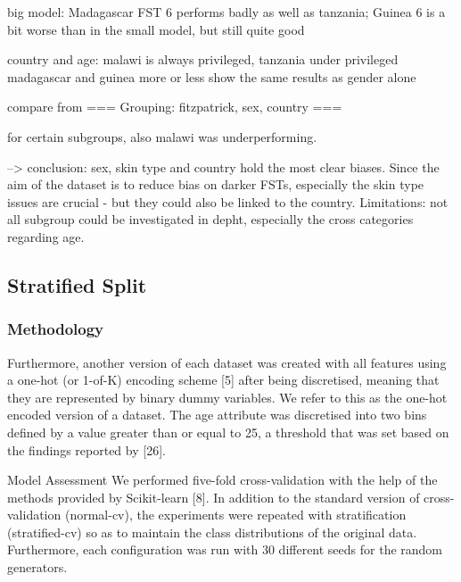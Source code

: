 \documentclass[12pt, a4paper, oneside]{book}   	%
\renewcommand{\paragraph}[1]{%
	\subsubsection*{#1}%
}
\newif\ifrawcitationactive
\newcommand{\rawcitationstart}{
	\color{purple}\rawcitationactivetrue
}
\begin{document}
			big model: Madagascar FST 6 performs badly as well as tanzania; Guinea 6 is a bit worse than in the small model, but still quite good
						
			
			country and age: malawi is always privileged, tanzania under privileged
			madagascar and guinea more or less show the same results as gender alone
			
			
			compare from === Grouping: fitzpatrick, sex, country ===
			
			
			for certain subgroups, also malawi was underperforming.
			
			--> conclusion: sex, skin type and country hold the most clear biases. Since the aim of the dataset is to reduce bias on darker FSTs, especially the skin type issues are crucial - but they could also be linked to the country.
			Limitations: not all subgroup could be investigated in depht, especially the cross categories regarding age.
			
			
			
			
			
			
			
	\subsection{Stratified Split}
		\paragraph{Methodology}
		
		\rawcitationstart
		Furthermore, another version of each dataset was created with all features using a one-hot (or 1-of-K) encoding scheme [5] after being discretised, meaning that they are represented by binary dummy variables. We refer to this as the one-hot encoded version of a dataset.
		\autocite{Valentim_2019}
		The age attribute was discretised into two bins defined by a value greater than or equal to 25, a threshold that was set based on the findings reported by [26]. \autocite{Valentim_2019}
		
		Model Assessment
		We performed five-fold cross-validation with the help of the methods provided by Scikit-learn [8]. In addition to the standard version of cross-validation (normal-cv), the experiments were repeated with stratification (stratified-cv) so as to maintain the class distributions of the original data. Furthermore, each configuration was run with 30 different seeds for the random generators.
		
\end{document}
